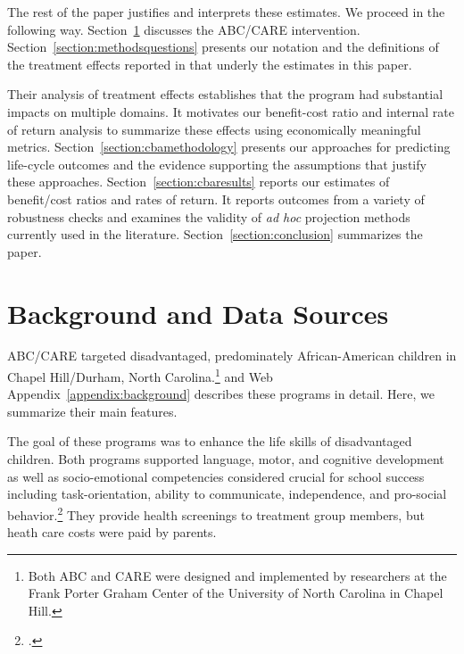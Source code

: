 The rest of the paper justifies and interprets these estimates. We proceed in the following way. Section~\ref{section:background} discusses the ABC/CARE intervention. Section~\ref{section:methodsquestions} presents our notation and the definitions of the treatment effects reported in \cite{Garcia_Ziff_2017_Gender-Diff_UNPUBLISHED} that underly the estimates in this paper.

Their analysis of treatment effects establishes that the program had substantial impacts on multiple domains. It motivates our benefit-cost ratio and internal rate of return analysis to summarize these effects using economically meaningful metrics. Section~\ref{section:cbamethodology} presents our approaches for predicting life-cycle outcomes and the evidence supporting the assumptions that justify these approaches. Section~\ref{section:cbaresults} reports our estimates of benefit/cost ratios and rates of return. It reports outcomes from a variety of robustness checks and examines the validity of \emph{ad hoc} projection methods currently used in the literature. Section~\ref{section:conclusion} summarizes the paper.


\section[Background and Data Sources]{Background and Data Sources} \label{section:background}

ABC/CARE targeted disadvantaged, predominately African-American children in Chapel Hill/Durham, North Carolina.\footnote{Both ABC and CARE were designed and implemented by researchers at the Frank Porter Graham Center of the University of North Carolina in Chapel Hill.} \cite{Garcia_Ziff_2017_Gender-Diff_UNPUBLISHED} and Web Appendix~\ref{appendix:background} describes these programs in detail. Here, we summarize their main features.

The goal of these programs was to enhance the life skills of disadvantaged children. Both programs supported language, motor, and cognitive development as well as socio-emotional competencies considered crucial for school success including task-orientation, ability to communicate, independence, and pro-social behavior.\footnote{\citet{Ramey_Collier_etal_1976_CarolinaAbecedarianProject, Ramey_etal_1985_Project-CARE_TiECSE, Sparling_1974_Synth_Edu_Infant_SPEECH, Wasik_Ramey_etal_1990_CD, Ramey-etal_2012-ABC}.} They provide health screenings to treatment group members, but heath care costs were paid by parents.

